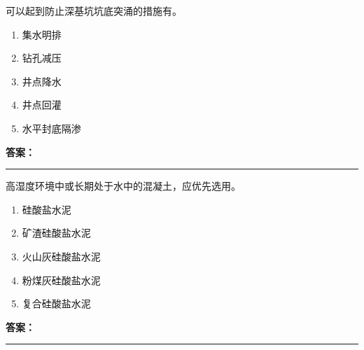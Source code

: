 \documentclass[UTF8,fontset=fandol,11pt]{ctexart}
\newcommand{\answerline}{\textcolor{answerred}{\rule{2.4cm}{0.7pt}}}
\begin{document}
\vspace{0.2em}

\begin{quizbox}[title={乱序第 69 题｜第三章基坑工程}]

可以起到防止深基坑坑底突涌的措施有。\\

\begin{enumerate}[label=\Alph*.]

\item 集水明排

\item 钻孔减压

\item 井点降水

\item 井点回灌

\item 水平封底隔渗

\end{enumerate}

\textbf{\textcolor{answerred}{答案：}} \answerline

\end{quizbox}

\vspace{0.2em}

\begin{quizbox}[title={乱序第 70 题｜第四章混凝土结构工程}]

高湿度环境中或长期处于水中的混凝土，应优先选用。\\

\begin{enumerate}[label=\Alph*.]

\item 硅酸盐水泥

\item 矿渣硅酸盐水泥

\item 火山灰硅酸盐水泥

\item 粉煤灰硅酸盐水泥

\item 复合硅酸盐水泥

\end{enumerate}

\textbf{\textcolor{answerred}{答案：}} \answerline

\end{quizbox}

\vspace{0.2em}
\end{document}
